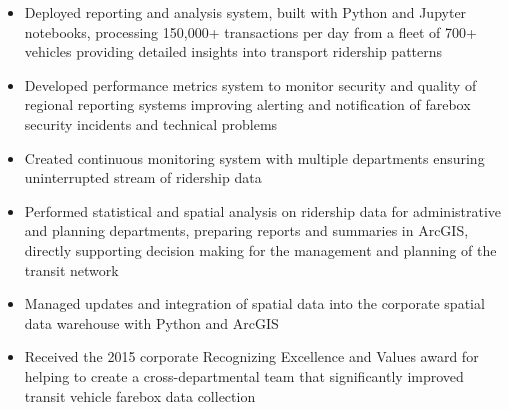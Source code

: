 \documentclass[letterpaper]{article}
\newcommand{\employer}[4]{
        \vspace{3pt}
        \textbf{#1}  %
        \hfill #2\\  %
        \textit{#3}  %
        \hfill #4\\  %
        \vspace{1mm}
    }
\newenvironment{jobtasklist}
        {
            \vspace{-12pt}
            \begin{itemize} \itemsep 0pt
        }{
            \end{itemize}
            \vspace{-3pt}
        }
\begin{document}
\begin{jobtasklist}
    \item Deployed reporting and analysis system, built with Python and Jupyter notebooks,
        processing 150,000+ transactions per day from a fleet of 700+ vehicles
        providing detailed insights into transport ridership patterns

    \item Developed performance metrics system to monitor security and quality
        of regional reporting systems improving alerting and notification of
        farebox security incidents and technical problems

    \item Created continuous monitoring system with multiple departments
            ensuring uninterrupted stream of ridership data

    \item Performed statistical and spatial analysis on ridership data for administrative
            and planning departments, preparing reports and summaries in ArcGIS, directly supporting
            decision making for the management and planning of the transit network

    \item Managed updates and integration of spatial data into the corporate spatial data warehouse
            with Python and ArcGIS

    \item Received the 2015 corporate Recognizing Excellence and Values award
        for helping to create a cross-departmental team that significantly
        improved transit vehicle farebox data collection


\end{jobtasklist}



%
%
%
\end{document}
